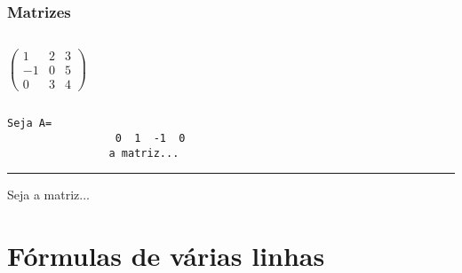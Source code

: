 \begin{frame}
  \frametitle{Matrizes}

  \begin{exemplo}
    \begin{columns}[c]
      \column{3cm}
      \[
      \begin{pmatrix}
         1 & 2 & 3 \\
        -1 & 0 & 5 \\
         0 & 3 & 4
      \end{pmatrix}
      \]
    \end{columns}
  \end{exemplo}


  \begin{exemplo}
    {\small
    \texttt{Seja\ \dolar{}A=\brown{\string\left(}\\
    \ \ \ \ \ \ \ \ \ \ \ \ \ \ \ \ \ 0\ \red{\et}\ 1\ \purple{\bs\bs} -1\ \red{\et}\ 0\\
    \ \ \ \ \ \ \ \ \ \ \ \ \ \ \ \brown{\string\right)}\dolar{}\ a\ matriz...}}

    \medskip\hrule\medskip

    Seja  a matriz...    
  \end{exemplo}

\end{frame}

\section{Fórmulas de várias linhas}

